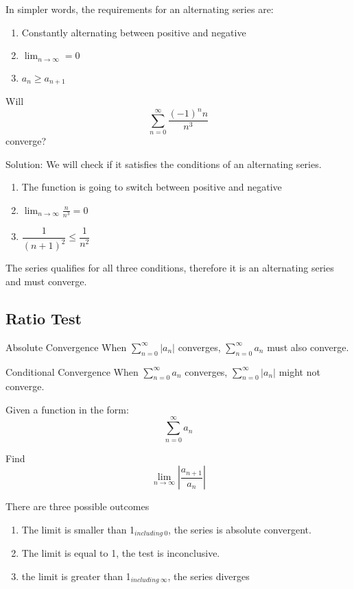 	In simpler words, the requirements for an alternating series are:
	\begin{enumerate}
	    \item Constantly alternating between positive and negative
	    \item $\displaystyle\lim_{n\to\infty}=0$
	    \item $a_n\geq a_{n+1}$
	\end{enumerate}
	
	\begin{simple}{}{}
	Will 
	$$\sum^\infty_{n=0} \frac{(-1)^nn}{n^3}$$
	converge?
	
	Solution:
	We will check if it satisfies the conditions of an alternating series.
	\begin{enumerate}
	    \item The function is going to switch between positive and negative
	    \item $\displaystyle\lim_{n\to\infty}\frac{n}{n^3}=0$
	    \item $\dfrac{1}{(n+1)^2}\leq\dfrac{1}{n^2}$
	\end{enumerate}
	
	The series qualifies for all three conditions, therefore it is an alternating series and must converge.
	\end{simple}
	
	\subsection{Ratio Test}
	\begin{theorem}{Absolute Convergence}{}
	    When $\displaystyle\sum^\infty_{n=0}\left|a_n\right|$ converges, $\displaystyle\sum^\infty_{n=0}a_n$ must also converge.
	\end{theorem}
	\begin{theorem}{Conditional Convergence}{}
	    When $\displaystyle\sum^\infty_{n=0}a_n$ converges, $\displaystyle\sum^\infty_{n=0}\left|a_n\right|$ might not converge.
	\end{theorem}
	
	\begin{theorem}{}{}
	    Given a function in the form:
	    $$\sum^\infty_{n=0}a_n$$
	    
	    Find 
	    \begin{equation}
	        \lim_{n\to\infty}\left|\frac{a_{n+1}}{a_n}\right|
	    \end{equation}
	    
	    There are three possible outcomes
        \begin{enumerate}
            \item The limit is smaller than 1$_{including\ 0}$, the series is absolute convergent.
            \item The limit is equal to 1, the test is inconclusive.
            \item the limit is greater than 1$_{including\ \infty}$, the series diverges
        \end{enumerate}
	\end{theorem}
	
